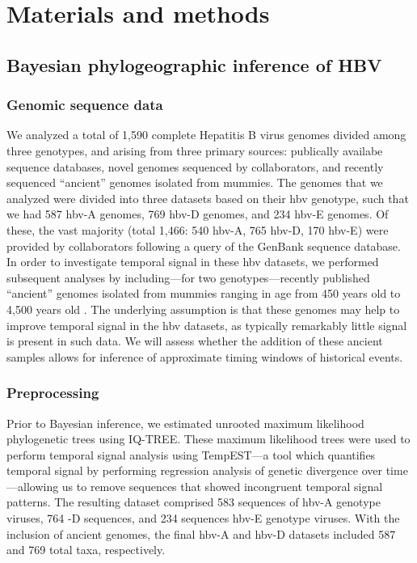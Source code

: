 \chapter{Materials and methods}
\label{ch:methodology}

\section{Bayesian phylogeographic inference of HBV}

\subsection{Genomic sequence data}
We analyzed a total of 1,590 complete Hepatitis B virus genomes divided among three genotypes, and arising from three primary sources: publically availabe sequence databases, novel genomes sequenced by collaborators, and recently sequenced ``ancient'' genomes isolated from mummies.
The genomes that we analyzed were divided into three datasets based on their \gls{hbv} genotype, such that we had 587 \gls{hbv}-A genomes, 769 \gls{hbv}-D genomes, and 234 \gls{hbv}-E genomes.
Of these, the vast majority (total 1,466: 540 \gls{hbv}-A, 765 \gls{hbv}-D, 170 \gls{hbv}-E) were provided by collaborators following a query of the GenBank sequence database. %
In order to investigate temporal signal in these \gls{hbv} datasets, we performed subsequent analyses by including---for two genotypes---recently published ``ancient'' genomes isolated from mummies ranging in age from 450 years old to 4,500 years old \cite{muhlemann2018ancient, ross2018paradox}.
The underlying assumption is that these genomes may help to improve temporal signal in the \gls{hbv} datasets, as typically remarkably little signal is present in such data.
We will assess whether the addition of these ancient samples allows for inference of approximate timing windows of historical events.

\subsection{Preprocessing}

Prior to Bayesian inference, we estimated unrooted maximum likelihood phylogenetic trees using IQ-TREE\cite{nguyen2015iq}.
These maximum likelihood trees were used to perform temporal signal analysis using TempEST\cite{rambaut2016exploring}---a tool which quantifies temporal signal by performing regression analysis of genetic divergence over time---allowing us to remove sequences that showed incongruent temporal signal patterns.
The resulting dataset comprised 583 sequences of \gls{hbv}-A genotype viruses, 764 -D sequences, and 234 sequences \gls{hbv}-E genotype viruses.
With the inclusion of ancient genomes, the final \gls{hbv}-A and \gls{hbv}-D datasets included 587 and 769 total taxa, respectively.

